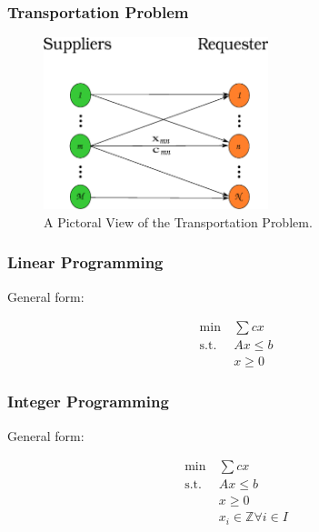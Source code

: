 
\begin{frame}[ctb!]
  \frametitle{Transportation Problem}

    \begin{figure}
      \includegraphics[height=5cm]{./images/xportation.eps}
      \caption{A Pictoral View of the Transportation Problem.}
    \end{figure}

\end{frame}

\begin{frame}[ctb!]
  \frametitle{Linear Programming}

  General form:

  \begin{subequations}
    \begin{align}
      \min \: & \sum c x \\
      \text{s.t.} \: & A x \leq b \\
                     & x   \geq 0
    \end{align}
  \end{subequations}
  
\end{frame}



\begin{frame}[ctb!]
  \frametitle{Integer Programming}

  General form:

  \begin{subequations}
    \begin{align}
      \min \: & \sum c x \\
      \text{s.t.} \: & A x \leq b \\
                     & x   \geq 0 \\
                     & x_i \in \mathbb{Z} \forall i \in I 
    \end{align}
  \end{subequations}
    
\end{frame}

  
